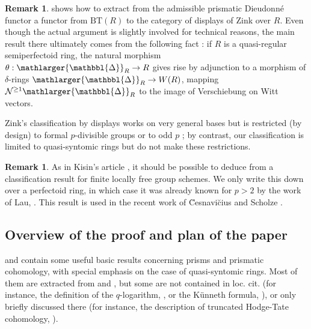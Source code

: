 \documentclass{amsart}
\newcommand{\prism}{{\mathlarger{\mathbbl{\Delta}}}}
\theoremstyle{plain}
\theoremstyle{definition}
\newtheorem{remark}[theorem]{Remark}
\newcommand{\purple}[1]{{\color{black} #1}}
\newcommand{\red}[1]{{\color{black} #1}}
\newcommand{\orange}[1]{{\color{black}#1}}
\begin{document}
\begin{remark}
 shows how to extract from the \red{admissible} prismatic Dieudonn\'e functor a functor from $\mathrm{BT}(R)$ to the category of displays of Zink over $R$. Even though the actual argument is slightly involved for technical reasons, the main result there ultimately comes from the following fact : if $R$ is a quasi-regular semiperfectoid ring, the natural morphism $\theta : \prism_R \to R$ gives rise by adjunction to a morphism of $\delta$-rings $\prism_R \to W(R)$, mapping $\mathcal{N}^{\geq 1} \prism_R$ to the image of Verschiebung on Witt vectors.

Zink's classification by displays works on very general bases but is restricted (by design) to formal $p$-divisible groups or to odd $p$ ; by contrast, our classification is limited to quasi-syntomic rings but do not make these restrictions. 
\end{remark}


\begin{remark}
  \label{remark-finite-flat-group-schemes-introduction}
As in Kisin's article \cite{kisin_crystalline_representations_and_f_crystals}, it should be possible to deduce from  a classification result for finite locally free group schemes. We only write this down over a perfectoid ring, in which case it was already known for $p>2$ by the work of Lau, \cite{lau_dieudonne_theory_over_semiperfect_rings_and_perfectoid_rings}. This result is used in \purple{the recent} work of \u{C}esnavi\u{c}ius and Scholze \cite{cesnavicius_scholze_purity_for_flat_cohomology}. 
\end{remark}


\subsection{Overview of the proof and plan of the paper}
 and  contain some useful basic results concerning prisms and prismatic cohomology, with special emphasis on the case of quasi-syntomic rings. Most of them are extracted from \cite{bhatt_morrow_scholze_topological_hochschild_homology} and \cite{bhatt_scholze_prisms_and_prismatic_cohomology}, but some are not contained in loc. cit. \orange{(for instance, the definition of the $q$-logarithm, \Cref{sec:q-logarithm}, or the K\"unneth formula, \Cref{sec:kunn-form-prism})}, or only briefly discussed there (for instance, the description of truncated Hodge-Tate cohomology, ).
\end{document}
